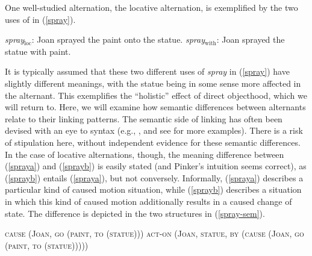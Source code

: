 \documentclass[output=paper,biblatex,babelshorthands,newtxmath,draftmode,colorlinks, citecolor=brown]{langscibook}
\begin{document}
One well-studied alternation, the locative alternation, is exemplified by the two uses of  in (\ref{spray}).

\begin{exe}
\ex \label{spray}
\begin{xlist}
\ex \label{spraya} \textit{spray$_{\text{loc}}$}: Joan sprayed the paint onto the statue.
\ex \label{sprayb} \textit{spray$_{\text{with}}$}: Joan sprayed the statue with paint.
\end{xlist}
\end{exe}

\noindent
It is typically assumed that these two different uses of \textit{spray} in (\ref{spray}) have
slightly different meanings, with the statue being in some sense more affected in the 
alternant.  This exemplifies the ``holistic'' effect of direct objecthood, which we will return to.  Here, we will examine how semantic differences
between alternants relate to their linking patterns.  The semantic side of linking has often been
devised with an eye to syntax (e.g., \citealt{Pinker1989}, and see \citealt{KoenigandDavis2006} for
more examples).  There is a risk of stipulation here, without independent evidence for these
semantic differences.  In the case of locative alternations, though, the meaning difference between
(\ref{spraya}) and (\ref{sprayb}) is easily stated (and Pinker's intuition seems correct), as
(\ref{sprayb}) entails (\ref{spraya}), but not conversely.  Informally, (\ref{spraya}) describes a
particular kind of caused motion situation, while (\ref{sprayb}) describes a situation in which
this kind of caused motion additionally results in a caused change of state.  The difference is
depicted in the two structures in (\ref{spray-sem}).

\begin{exe}\ex\label{spray-sem}
\begin{xlist}
\ex \label{spray-sema} \textsc{cause (Joan, go (paint, to (statue)))}
\ex \label{spray-semb} \textsc{act-on (Joan, statue, by (cause (Joan, go (paint, to (statue)))))}
\end{xlist}
\end{exe}
\end{document}
